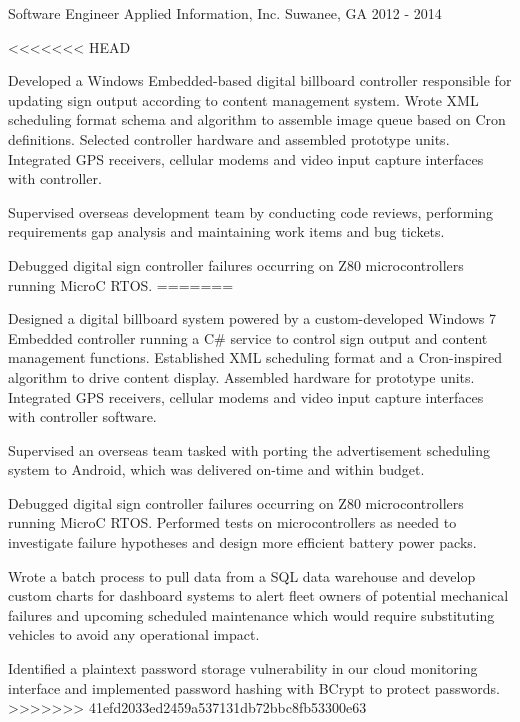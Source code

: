 \begin{cventries}
  \cventry
    {Software Engineer} %
    {Applied Information, Inc.} %
    {Suwanee, GA} %
    {2012 - 2014} %
    {
      \begin{cvitems} %
<<<<<<< HEAD
        \item {Developed a Windows Embedded-based digital billboard controller responsible for updating sign output according to content management system. Wrote XML scheduling format schema and algorithm to assemble image queue based on Cron definitions. Selected controller hardware and assembled prototype units. Integrated GPS receivers, cellular modems and video input capture interfaces with controller.}
		\item {Supervised overseas development team by conducting code reviews, performing requirements gap analysis and maintaining work items and bug tickets.}
		\item {Debugged digital sign controller failures occurring on Z80 microcontrollers running MicroC RTOS.}
=======
        \item {Designed a digital billboard system powered by a custom-developed Windows 7 Embedded controller running a C# service to control sign output and content management functions. Established XML scheduling format and a Cron-inspired algorithm to drive content display. Assembled hardware for prototype units. Integrated GPS receivers, cellular modems and video input capture interfaces with controller software.}
		\item {Supervised an overseas team tasked with porting the advertisement scheduling system to Android, which was delivered on-time and within budget.}
		\item {Debugged digital sign controller failures occurring on Z80 microcontrollers running MicroC RTOS. Performed tests on microcontrollers as needed to investigate failure hypotheses and design more efficient battery power packs.}
		\item {Wrote a batch process to pull data from a SQL data warehouse and develop custom charts for dashboard systems to alert fleet owners of potential mechanical failures and upcoming scheduled maintenance which would require substituting vehicles to avoid any operational impact.}
		\item {Identified a plaintext password storage vulnerability in our cloud monitoring interface and implemented password hashing with BCrypt to protect passwords.}
>>>>>>> 41efd2033ed2459a537131db72bbc8fb53300e63
      \end{cvitems}
    }


\end{cventries}
